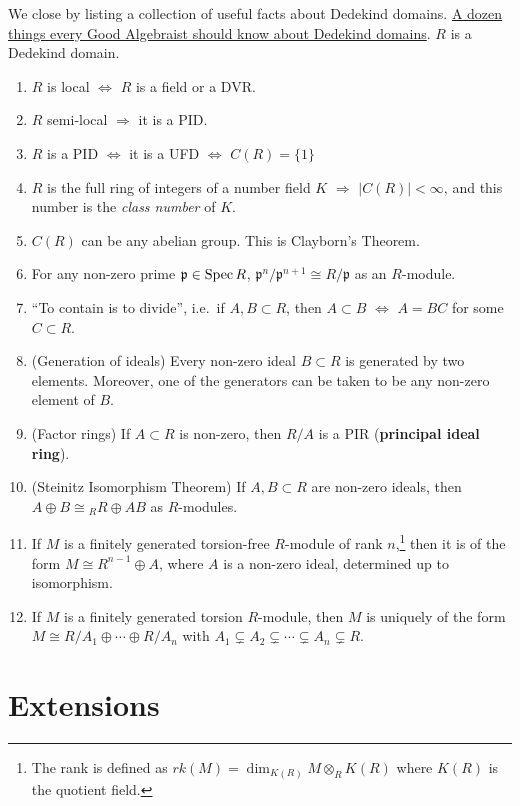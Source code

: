 We close by listing a collection of useful facts about Dedekind domains.
 \underline{A dozen things every Good Algebraist should know about Dedekind domains}. $R$
 is a Dedekind domain.
 \begin{enumerate}
   \item $R$ is local $\Longleftrightarrow$ $R$ is a field or a DVR.
   \item $R$ semi-local $\Longrightarrow$ it is a PID.
   \item $R$ is a PID $\Longleftrightarrow$ it is a UFD $\Longleftrightarrow$ $C(R)=\{1\}$
   \item $R$ is the full ring of integers of a number field $K$ $\Longrightarrow$ $|C(R)|<
   \infty$, and this number is the \emph{class number} of $K$.
   \item $C(R)$ can be any abelian group. This is Clayborn's Theorem.
   \item For any non-zero prime $\mathfrak{p}\in \operatorname{Spec} R$, $\mathfrak{p}^n/\mathfrak{p}^{n+1}\cong R/\mathfrak{p}$ as an
   $R$-module.
   \item ``To contain is to divide'', i.e.~if $A,B\subset R$, then $A\subset B$
   $\Longleftrightarrow$ $A=BC$ for some $C\subset R$.
   \item (Generation of ideals) Every non-zero ideal $B\subset R$ is generated by two elements.
   Moreover, one of the generators can be taken to be any non-zero element of $B$.
   \item (Factor rings) If $A\subset R$ is non-zero, then $R/A$ is a PIR
	(\textbf{principal ideal ring}).
   \item (Steinitz Isomorphism Theorem) If $A,B\subset R$ are non-zero ideals, then $A\oplus
   B\cong {}_RR\oplus AB$ as $R$-modules.
   \item If $M$ is a finitely generated torsion-free $R$-module of rank $n$,\footnote{The
   rank is defined as $rk(M)=\dim_{K(R)} M\otimes_R K(R)$ where $K(R)$ is the
	quotient field.} then it is of the
   form $M\cong R^{n-1}\oplus A$, where $A$ is a non-zero ideal, determined up to
   isomorphism.
   \item If $M$ is a finitely generated torsion $R$-module, then $M$ is uniquely of the
   form $M\cong R/A_1\oplus
   \cdots \oplus R/A_n$ with $A_1\subsetneq A_2\subsetneq \cdots \subsetneq
   A_n\subsetneq R$.
    \end{enumerate}


\section{Extensions}


